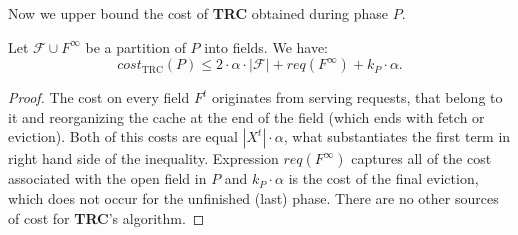 Now we upper bound the cost of \textbf{TRC} obtained during phase $P$.
\begin{lemma}
Let $\mathcal{F} \cup F^{\infty}$ be a partition of $P$ into fields. We have:
$$cost_{\mathrm{TRC}}(P) \leq 2 \cdot \alpha \cdot |\mathcal{F}| + 
req(F^{\infty}) + k_P \cdot 
\alpha.$$ 
\label{thm:trc_cost}
\end{lemma}
\begin{proof}
The cost on every field $F^t$ originates from serving requests, that belong 
to it and reorganizing the cache at the end of the field (which ends with fetch or 
eviction). Both of this costs are equal 
$|X^t| \cdot \alpha$, what substantiates the first term in right hand side of the 
inequality. Expression $req(F^{\infty})$ captures all of the cost associated 
with the open field in $P$ and $k_P \cdot \alpha$ is the cost of the final eviction, 
which does not occur for the unfinished (last) phase. There are no other sources of
cost for \textbf{TRC}'s algorithm.
\end{proof}

